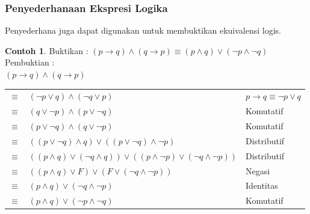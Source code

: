 \documentclass[handout]{beamer}
\theoremstyle{definition}
\theoremstyle{example}
\newtheorem{contoh}[theorem]{Contoh}
\begin{document}
\begin{frame}
	\frametitle{Penyederhanaan Ekspresi Logika}
	Penyederhana juga dapat digunakan untuk membuktikan ekuivalensi logis.\\
	\begin{contoh}
		Buktikan : $(p \rightarrow q)\wedge(q \rightarrow p)\equiv(p \wedge q)\vee(\neg p \wedge \neg q)$ \\
		Pembuktian :\\
		$(p \rightarrow q)\wedge(q \rightarrow p)$\\		
		\begin{tabular}{ l l  l  }						
			$\equiv$ & $(\neg p \vee q)\wedge(\neg q \vee p)$ & $p \rightarrow q \equiv \neg p \vee q$   \\ 
			$\equiv$ & $(q \vee \neg p)\wedge(p \vee \neg q)$ & Komutatif   \\ 
			$\equiv$ & $(p \vee \neg q)\wedge(q \vee \neg p)$ & Komutatif \\ 
			$\equiv$ & $((p \vee \neg q)\wedge q)\vee((p \vee \neg q)\wedge \neg p)$ & Distributif  \\ 
			$\equiv$ & $((p \wedge q)\vee(\neg q \wedge q))\vee((p \wedge \neg p)\vee(\neg q \wedge \neg p))$ & Distributif  \\ 
			$\equiv$ & $((p \wedge q)\vee F)\vee(F\vee(\neg q \wedge \neg p))$ & Negasi   \\ 
			$\equiv$ & $(p \wedge q)\vee(\neg q \wedge \neg p)$ & Identitas   \\ 
			$\equiv$ & $(p \wedge q)\vee(\neg p \wedge \neg q)$ & Komutatif  			
		\end{tabular}
	\end{contoh}	
\end{frame}
\end{document}
